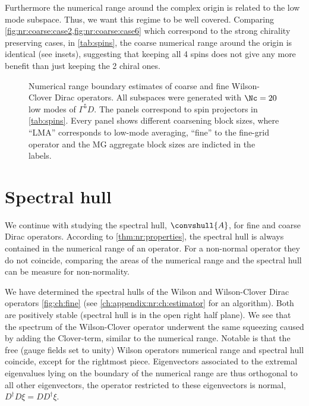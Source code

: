 Furthermore the numerical range around the complex origin is related to the low mode subspace.
Thus, we want this regime to be well covered.
Comparing \cref{fig:nr:coarse:case2,fig:nr:coarse:case6} which correspond to the strong chirality preserving cases,  in \cref{tab:spins}, the coarse numerical range around the origin is identical (see insets), suggesting that keeping all \num{4} spins does not give any more benefit than just keeping the \num{2} chiral ones.

\begin{figure}
\centering

\hfill
{}

\hfill
{}

\caption{
Numerical range boundary estimates of coarse and fine Wilson-Clover Dirac operators.
All subspaces were generated with $\Nc=20$ low modes of $\Gamma^{5} D$.
The panels correspond to spin projectors in \cref{tab:spins}.
Every panel shows different coarsening block sizes, where ``LMA'' corresponds to low-mode averaging, ``fine'' to the fine-grid operator and the MG aggregate block sizes are indicted in the labels.
}
\label{fig:nr:coarse}
\end{figure}

\section{Spectral hull}

We continue with studying the spectral hull, $\convshull{A}$, for fine and coarse Dirac operators.
According to \cref{thm:nr:properties}, the spectral hull is always contained in the numerical range of an operator.
For a non-normal operator they do not coincide, comparing the areas of the numerical range and the spectral hull can be measure for non-normality.

We have determined the spectral hulls of the Wilson and Wilson-Clover Dirac operators \cref{fig:ch:fine} (see \cref{ch:appendix:nr:ch:estimator} for an algorithm).
Both are positively stable (spectral hull is in the open right half plane).
We see that the spectrum of the Wilson-Clover operator underwent the same squeezing caused by adding the Clover-term, similar to the numerical range.
Notable is that the free (gauge fields set to unity) Wilson operators numerical range and spectral hull coincide, except for the rightmost piece.
Eigenvectors associated to the extremal eigenvalues lying on the boundary of the numerical range are thus orthogonal to all other eigenvectors, \ie the operator restricted to these eigenvectors is normal, $D^\dagger D \xi = D D^\dagger \xi$.

